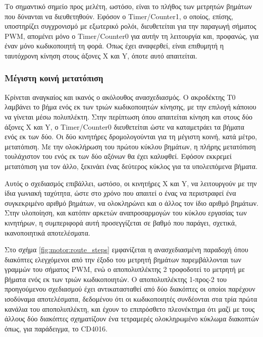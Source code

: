 Το σημαντικό σημείο προς μελέτη, ωστόσο, είναι το πλήθος των μετρητών βημάτων
που δύνανται να διευθετηθούν. Εφόσον ο \textenglish{Timer\slash Counter1}, ο
οποίος, επίσης, υποστηρίζει συγχρονισμό με εξωτερικό ρολόι, διευθετείται για την
παραγωγή σήματος PWM, απομένει μόνο ο \textenglish{Timer\slash Counter0} για
αυτήν τη λειτουργία και, προφανώς, για έναν μόνο κωδικοποιητή τη φορά. Όπως έχει
αναφερθεί, είναι επιθυμητή η ταυτόχρονη κίνηση στους άξονες X και Y, όποτε αυτό
απαιτείται.


\subsubsection{Μέγιστη κοινή μετατόπιση}

Κρίνεται αναγκαίος και ικανός ο ακόλουθος ανασχεδιασμός. Ο ακροδέκτης T0
λαμβάνει το βήμα ενός εκ των τριών κωδικοποιητών κίνησης, με την επιλογή κάποιου
να γίνεται μέσω πολυπλέκτη. Στην περίπτωση όπου απαιτείται κίνηση και στους δύο
άξονες X και Y, ο \textenglish{Timer\slash Counter0} διευθετείται ώστε να
καταμετράει τα βήματα ενός εκ των δύο. Οι δύο κινητήρες δρομολογούνται για τη
μέγιστη κοινή, κατά μέτρο, μετατόπιση. Με την ολοκλήρωση του πρώτου κύκλου
βημάτων, η πλήρης μετατόπιση τουλάχιστον του ενός εκ των δύο αξόνων θα έχει
καλυφθεί. Εφόσον εκκρεμεί μετατόπιση για τον άλλο, ξεκινάει ένας δεύτερος κύκλος
για τα υπολειπόμενα βήματα.

Αυτός ο σχεδιασμός επιβάλλει, ωστόσο, οι κινητήρες X και Y, να λειτουργούν με
την ίδια γωνιακή ταχύτητα, ώστε στο χρόνο που απαιτεί ο ένας να περιστραφεί
ένα συγκεκριμένο αριθμό βημάτων, να ολοκληρώνει και ο άλλος τον ίδιο αριθμό
βημάτων. Στην υλοποίηση, και κατόπιν αρκετών αναπροσαρμογών του κύκλου εργασίας
των κινητήρων, η συμπεριφορά αυτή προσεγγίζεται σε βαθμό που παράγει, σχετικά,
ικανοποιητικά αποτελέσματα.

Στο σχήμα \ref{fig:motor:route_steps} εμφανίζεται η ανασχεδιασμένη παραδοχή
όπου διακόπτες ελεγχόμενοι από την έξοδο του μετρητή βημάτων παρεμβάλλονται των
γραμμών του σήματος PWM, ενώ ο αποπολυπλέκτης 2 τροφοδοτεί το μετρητή με βήματα
ενός εκ των τριών κωδικοποιητών. Ο αποπολυπλέκτης 1-προς-2 του προηγούμενου
σχεδιασμού έχει αντικατασταθεί από δύο διακόπτες οι οποίοι παρέχουν ισοδύναμα
αποτελέσματα, δεδομένου ότι οι κωδικοποιητές συνδέονται στα τρία πρώτα κανάλια
του αποπολυπλέκτη, και έχουν το επιπρόσθετο πλεονέκτημα ότι μαζί με τους άλλους
δύο διακόπτες σχηματίζουν ένα τετραμερές ολοκληρωμένο κύκλωμα διακοπτών όπως,
για παράδειγμα, το CD4016.

